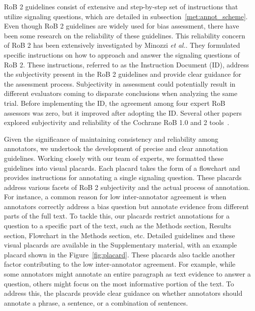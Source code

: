\documentclass[sn-mathphys,Numbered]{sn-jnl}%
\theoremstyle{thmstyleone}%
\theoremstyle{thmstyletwo}%
\theoremstyle{thmstylethree}%
\begin{document}
RoB 2 guidelines consist of extensive and step-by-step set of instructions that utilize signaling questions, which are detailed in subsection~\ref{met:annot_scheme}.
Even though RoB 2 guidelines are widely used for bias assessment, there have been some research on the reliability of these guidelines.
This reliability concern of RoB 2 has been extensively investigated by Minozzi \textit{et al.}. 
They formulated specific instructions on how to approach and answer the signaling questions of RoB 2.
These instructions, referred to as the Instruction Document (ID), address the subjectivity present in the RoB 2 guidelines and provide clear guidance for the assessment process.
Subjectivity in assessment could potentially result in different evaluators coming to disparate conclusions when analyzing the same trial.
Before implementing the ID, the agreement among four expert RoB assessors was zero, but it improved after adopting the ID.
Several other papers explored subjectivity and reliability of the Cochrane RoB 1.0 and 2 tools~\cite{minozzi2022reliability,da2017effect,loef2022interrater,minozzi2020revised}.


Given the significance of maintaining consistency and reliability among annotators, we undertook the development of precise and clear annotation guidelines.
Working closely with our team of experts, we formatted these guidelines into visual placards.
Each placard takes the form of a flowchart and provides instructions for annotating a single signaling question.
These placards address various facets of RoB 2 subjectivity and the actual process of annotation.
For instance, a common reason for low inter-annotator agreement is when annotators correctly address a bias question but annotate evidence from different parts of the full text. 
To tackle this, our placards restrict annotations for a question to a specific part of the text, such as the Methods section, Results section, Flowchart in the Methods section, etc.
Detailed guidelines and these visual placards are available in the Supplementary material, with an example placard shown in the Figure~\ref{fig:placard}.
These placards also tackle another factor contributing to the low inter-annotator agreement.
For example, while some annotators might annotate an entire paragraph as text evidence to answer a question, others might focus on the most informative portion of the text.
To address this, the placards provide clear guidance on whether annotators should annotate a phrase, a sentence, or a combination of sentences.
%
%
%
\end{document}
